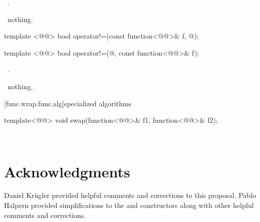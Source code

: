 \documentclass[american,twoside]{book}
\begin{document}
\begin{itemdescr}
\pnum\returns\ .

\pnum\throws\ nothing.
\end{itemdescr}

\begin{itemdecl}
template <@@>
  bool operator!=(const function<@@>& f, @\unspecnull@);

template <@@>
  bool operator!=(@\unspecnull@, const function<@@>& f);
\end{itemdecl}

\begin{itemdescr}
\pnum\returns\ .

\pnum\throws\ nothing.
\end{itemdescr}

[func.wrap.func.alg]{specialized algorithms}

%
%
\begin{itemdecl}
template<@@>
  void swap(function<@@>& f1, function<@@>& f2);
\end{itemdecl}

\begin{itemdescr}
\pnum\effects\ 
\end{itemdescr}
%

\section*{Acknowledgments}
Daniel Kr\"ugler provided helpful comments and corrections to this
proposal. Pablo Halpern provided simplifications to the 
and  constructors along with other helpful comments and
corrections.



\end{document}
